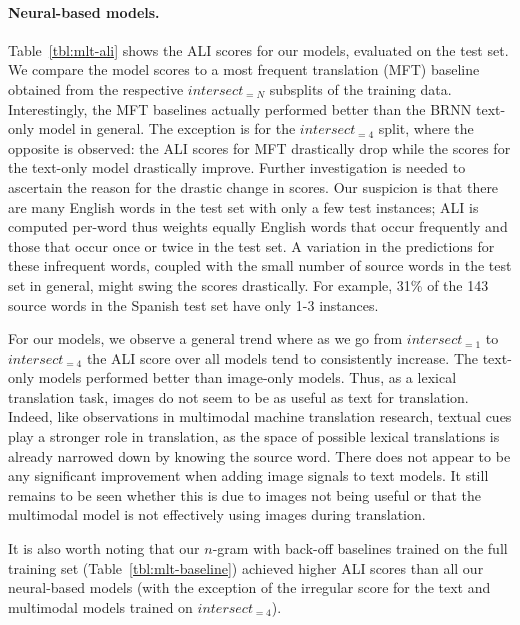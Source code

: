 \documentclass[twocolumn]{svjour3}          \smartqed  \usepackage{graphicx}
\begin{document}
\paragraph{Neural-based models. } Table~\ref{tbl:mlt-ali} shows the ALI scores for our models, evaluated on the test set. We compare the model scores to a most frequent translation (MFT) baseline obtained from the respective $intersect_{=N}$ subsplits of the training data.
Interestingly, the MFT baselines actually performed better than the BRNN text-only model in general. The exception is for the $intersect_{=4}$ split, where the opposite is observed: the ALI scores for MFT drastically drop while the scores for the text-only model drastically improve. Further investigation is needed to ascertain the reason for the drastic change in scores. Our suspicion is that there are many English words in the test set with only a few test instances; ALI is computed per-word thus weights equally English words that occur frequently and those that occur once or twice in the test set. A variation in the predictions for these infrequent words, coupled with the small number of source words in the test set in general, might swing the scores drastically. For example, 31\% of the 143 source words in the Spanish test set have only 1-3 instances. 

For our models, we observe a general trend where as we go from $intersect_{=1}$ to $intersect_{=4}$ the ALI score over all models tend to consistently increase. The text-only models performed better than image-only models. Thus, as a lexical translation task, images do not seem to be as useful as text for translation. Indeed, like observations in multimodal machine translation research, textual cues play a stronger role in translation, as the space of possible lexical translations is already narrowed down by knowing the source word. There does not appear to be any significant improvement when adding image signals to text models. It still remains to be seen whether this is due to images not being useful or that the multimodal model is not effectively using images during translation.

It is also worth noting that our $n$-gram with back-off baselines trained on the full training set (Table~\ref{tbl:mlt-baseline}) achieved higher ALI scores than all our neural-based models (with the exception of the irregular score for the text and multimodal models trained on $intersect_{=4}$).
\end{document}
